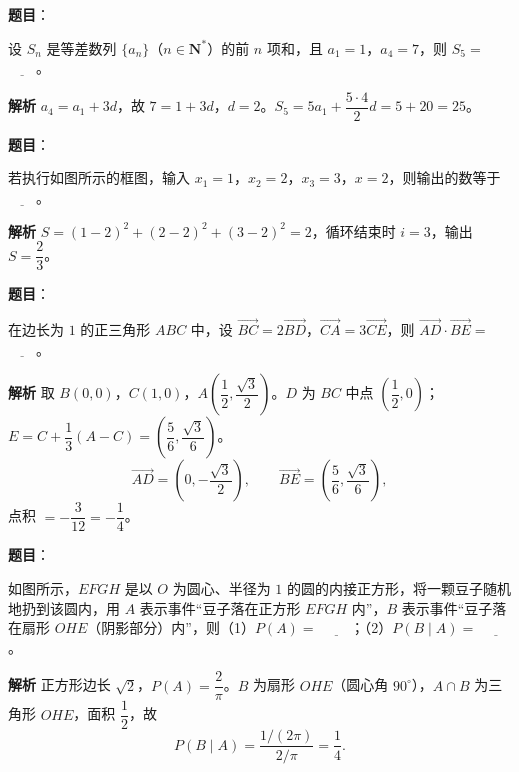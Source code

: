 \begin{answer}

\textbf{题目}：

设 $S_n$ 是等差数列 $\{a_n\}$（$n\in\mathbf N^*$）的前 $n$ 项和，且 $a_1=1$，$a_4=7$，则 $S_5=$ $\underline{\qquad}$。

\textbf{解析}
$a_4=a_1+3d$，故 $7=1+3d$，$d=2$。$S_5=5a_1+\dfrac{5\cdot4}2d=5+20=25$。


\end{answer}
\begin{answer}

\textbf{题目}：

若执行如图所示的框图，输入 $x_1=1$，$x_2=2$，$x_3=3$，$x=2$，则输出的数等于 $\underline{\qquad}$。
\nopagebreak[4]
\begin{center}\end{center}
\nopagebreak[4]
\textbf{解析}
$S=(1-2)^2+(2-2)^2+(3-2)^2=2$，循环结束时 $i=3$，输出 $S=\dfrac23$。


\end{answer}
\begin{answer}

\textbf{题目}：

在边长为 $1$ 的正三角形 $ABC$ 中，设 $\overrightarrow{BC}=2\overrightarrow{BD}$，$\overrightarrow{CA}=3\overrightarrow{CE}$，则 $\overrightarrow{AD}\cdot\overrightarrow{BE}=$ $\underline{\qquad}$。

\textbf{解析}
取 $B(0,0)$，$C(1,0)$，$A\left(\dfrac12,\dfrac{\sqrt3}2\right)$。$D$ 为 $BC$ 中点 $\left(\dfrac12,0\right)$；$E=C+\dfrac13(A-C)=\left(\dfrac56,\dfrac{\sqrt3}6\right)$。
\nopagebreak[4]
\[\overrightarrow{AD}=\left(0,-\frac{\sqrt3}2\right),\qquad \overrightarrow{BE}=\left(\frac56,\frac{\sqrt3}6\right),\]
点积 $=-\dfrac{3}{12}=-\dfrac14$。


\end{answer}
\begin{answer}

\textbf{题目}：

如图所示，$EFGH$ 是以 $O$ 为圆心、半径为 $1$ 的圆的内接正方形，将一颗豆子随机地扔到该圆内，用 $A$ 表示事件“豆子落在正方形 $EFGH$ 内”，$B$ 表示事件“豆子落在扇形 $OHE$（阴影部分）内”，则（1）$P(A)=$ $\underline{\qquad}$；（2）$P(B\mid A)=$ $\underline{\qquad}$。
\nopagebreak[4]
\begin{center}\end{center}
\nopagebreak[4]
\textbf{解析}
正方形边长 $\sqrt2$，$P(A)=\dfrac{2}{\pi}$。$B$ 为扇形 $OHE$（圆心角 $90^\circ$），$A\cap B$ 为三角形 $OHE$，面积 $\dfrac12$，故
\nopagebreak[4]
\[P(B\mid A)=\frac{1/(2\pi)}{2/\pi}=\frac14.\]


\end{answer}
